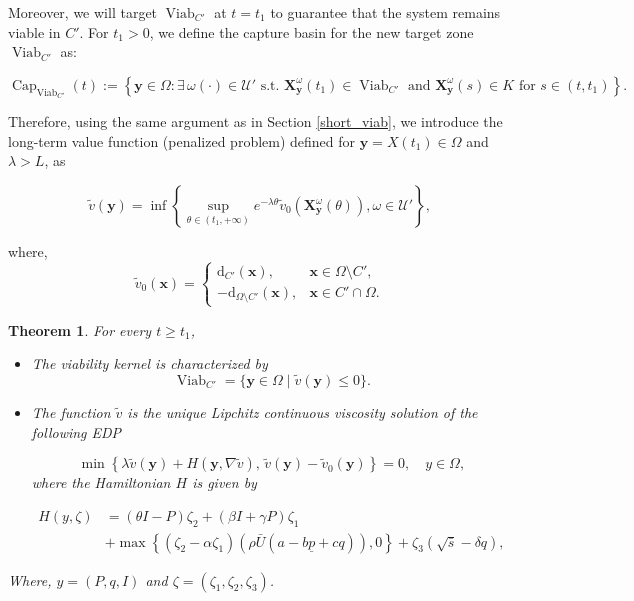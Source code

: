 \documentclass[]{interact}
\theoremstyle{plain}%
\newtheorem{theorem}{Theorem}[section]
\theoremstyle{definition}
\theoremstyle{remark}
\begin{document}
Moreover, we will target  \(\operatorname{Viab}_{C'}\) at \(t = t_{1}\) to guarantee that the system remains viable in \(C'\). For \(t_{1} > 0\), we define the capture basin for the new target zone \(\operatorname{Viab}_{C'}\) as:

\[
\operatorname{Cap}_{\operatorname{Viab}_{C'}}(t) := \left\{ \mathbf{y}  \in \Omega : \exists\, \omega(\cdot) \in \mathcal{U'} \text{ s.t. } \mathbf{X}_{\mathbf{y}}^\omega(t_{1}) \in \operatorname{Viab}_{C'} \text{ and } \mathbf{X}_{\mathbf{y}}^\omega(s) \in K \text{ for } s \in (t, t_{1}) \right\}.
\]



Therefore, using the same argument as in Section \ref{short_viab}, we introduce the long-term value function (penalized problem) defined for $\mathbf{y}  = X(t_1)\in \Omega$ and $\lambda > L $, as



\begin{equation}\label{uti_viab}
\tilde{v}(\mathbf{y} )= \inf\left\{ \sup_{\theta \in (t_{1}, +\infty)} e^{-\lambda \theta} \tilde{v}_0 \left(\mathbf{X}_{\mathbf{y}}^\omega(\theta)\right), \omega \in \mathcal{U'} \right\},
\end{equation}

where,
\begin{equation}\label{v0l}
\tilde{v}_{0}(\mathbf{x}) = \begin{cases} 
\mathrm{d}_{C'}(\mathbf{x}), & \mathbf{x} \in \Omega \setminus C', \\ 
-\mathrm{d}_{\Omega \setminus C'}(\mathbf{x}), & \mathbf{x} \in C' \cap \Omega.

\end{cases}
\end{equation}


\begin{theorem}\label{HJBV_long}
For every \( t \geq t_{1} \),
\begin{itemize}
\item[i.]  The viability kernel is characterized by
\[ 
\operatorname{Viab}_{C'} = \{\mathbf{y} \in \Omega \mid \tilde{v}( \mathbf{y}) \leq 0\}.
\]

\item[ii.] The function $\tilde{v}$ is the unique Lipchitz continuous viscosity solution of the following EDP

\begin{equation}\label{HJB1}
\min \left\{ \lambda \tilde{v}(\mathbf{y}) + H(\mathbf{y}, \nabla \tilde{v}), \, \tilde{v}(\mathbf{y}) - \tilde{v}_{0}(\mathbf{y}) \right\} = 0, \quad  y \in \Omega, 
\end{equation}
where the Hamiltonian \( H \) is given by

\begin{align*}
  H(y, \zeta) & = (\theta I - P) \zeta_2 + (\beta I + \gamma P) \zeta_1 \\
  &+ \max \left\{ \left( \zeta_2 - \alpha \zeta_1 \right) (\rho \bar{U} (a - b \underline{p} + cq)), 0 \right\} + \zeta_3 \left( \sqrt{\bar{s}} - \delta q \right),
\end{align*}
\end{itemize}
Where, $y=(P, q, I)$ and $\zeta= (\zeta_1, \zeta_2, \zeta_3 )$.
\end{theorem}
\end{document}
